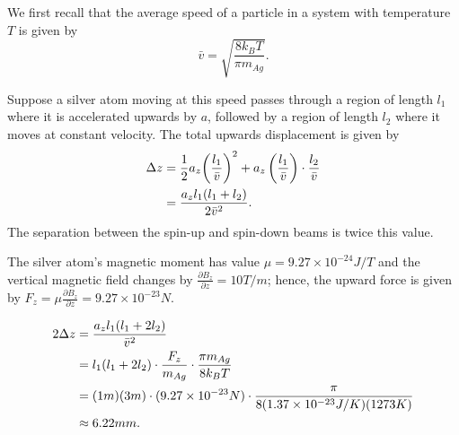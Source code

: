\item

We first recall that the average speed of a particle in a system with temperature $T$ is given by
\[
	\bar{v} = \sqrt{\frac{8 k_B T}{\pi m_{Ag}}}.
\]

Suppose a silver atom moving at this speed passes through a region of length $l_1$ where it is accelerated upwards by $a$,
followed by a region of length $l_2$ where it moves at constant velocity.
The total upwards displacement is given by
\begin{align*}
	\Delta z
	&= \frac{1}{2} a_z {\left( \frac{l_1}{\bar{v}} \right)}^2 + a_z \left( \frac{l_1}{\bar{v}} \right) \cdot \frac{l_2}{\bar{v}} \\
	&= \frac{a_z l_1 (l_1 + l_2)}{2 \bar{v}^2}.
\end{align*}
The separation between the spin-up and spin-down beams is twice this value.

The silver atom's magnetic moment has value $\mu = 9.27 \times 10^{-24} J/T$
and the vertical magnetic field changes by $\frac{\partial B_z}{\partial z} = 10 T/m$;
hence, the upward force is given by $F_z = \mu \frac{\partial B_z}{\partial z} = 9.27 \times 10^{-23} N$.

\begin{align*}
	2\Delta z
	&= \frac{a_z l_1 (l_1 + 2l_2)}{\bar{v}^2} \\
	&= l_1 (l_1 + 2l_2) \cdot \frac{F_z}{m_{Ag}} \cdot \frac{\pi m_{Ag}}{8 k_B T} \\
	&= (1 m) (3 m) \cdot (9.27 \times 10^{-23} N) \cdot \frac{\pi}{8 (1.37\times10^{-23} J/K) (1273 K)} \\
	&\approx 6.22 mm.
\end{align*}
